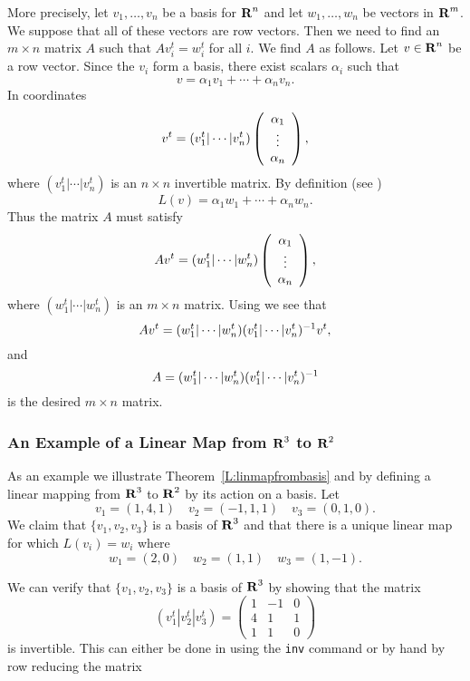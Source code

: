 More precisely, let $v_1,\ldots,v_n$ be a basis for $\mbox{$\bf{R}$}^n$ and
let $w_1,\ldots,w_n$ be vectors in $\mbox{$\bf{R}$}^m$.  We suppose that all
of these vectors are row vectors.  Then we need to find
an $m\times n$ matrix $A$ such that $Av_i^t=w_i^t$ for all $i$.
We find $A$ as follows.  Let $v\in\mbox{$\bf{R}$}^n$ be a row vector.  Since
the $v_i$ form a basis, there exist scalars $\alpha_i$ such that
\[
v=\alpha_1 v_1 + \cdots + \alpha_n v_n.
\]
In coordinates
\begin{equation}  \label{e:v^t}
v^t = (v_1^t|\cdots|v_n^t)\left(\begin{array}{c} \alpha_1 \\ \vdots \\ \alpha_{n}\end{array}\right),
\end{equation}
where $(v_1^t|\cdots|v_n^t)$ is an $n\times n$
invertible matrix.
By definition (see )
\[
L(v) = \alpha_1 w_1 + \cdots + \alpha_n w_n.
\]
Thus the matrix $A$ must satisfy
\[
Av^t = (w_1^t|\cdots|w_n^t)\left(\begin{array}{c} \alpha_1 \\ \vdots \\ \alpha_{n}\end{array}\right),
\]
where $(w_1^t|\cdots|w_n^t)$ is an $m\times n$ matrix.
Using  we see that
\[
Av^t = (w_1^t|\cdots|w_n^t)(v_1^t|\cdots|v_n^t)^{-1} v^t,
\]
and
\begin{equation}  \label{e:defA}
A = (w_1^t|\cdots|w_n^t)(v_1^t|\cdots|v_n^t)^{-1}
\end{equation}
is the desired $m\times n$ matrix.

\subsubsection*{An Example of a Linear Map from $\mbox{$\bf{R}$}^3$ to $\mbox{$\bf{R}$}^2$}

As an example we illustrate Theorem~\ref{L:linmapfrombasis} and
 by defining a linear mapping from $\mbox{$\bf{R}$}^3$ to $\mbox{$\bf{R}$}^2$
by its action on a basis.  Let
\[
v_1=(1,4,1)\quad v_2=(-1,1,1) \quad v_3=(0,1,0).
\]
We claim that $\{v_1,v_2,v_3\}$ is a basis of $\mbox{$\bf{R}$}^3$ and that
there is a unique linear map for which $L(v_i)=w_i$ where
\[
w_1=(2,0) \quad w_2=(1,1) \quad w_3=(1,-1).
\]

We can verify that $\{v_1,v_2,v_3\}$ is a basis of $\mbox{$\bf{R}$}^3$ by
showing that the matrix
\[
(v_1^t|v_2^t|v_3^t) = \left(\begin{array}{rrr}
1 & -1 & 0  \\
4 & 1 & 1  \\
1 & 1 & 0  \end{array}\right)
\]
is invertible.  This can either be done in \Matlab using the
{\tt inv} command or by hand by row reducing the matrix

